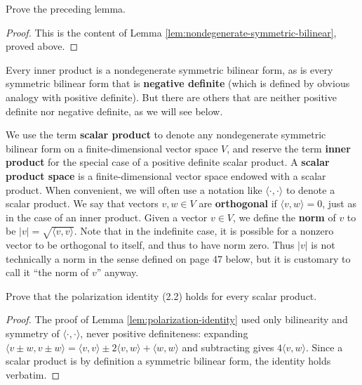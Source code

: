 \begin{exercise}
\label{exer:prove-nondegenerate-equivalent}
\leanok
{}
Prove the preceding lemma.
\end{exercise}

\begin{proof}
\leanok
This is the content of Lemma \ref{lem:nondegenerate-symmetric-bilinear}, proved above.
\end{proof}

Every inner product is a nondegenerate symmetric bilinear form, as is every symmetric bilinear form that is \textbf{negative definite} (which is defined by obvious analogy with positive definite). But there are others that are neither positive definite nor negative definite, as we will see below.

We use the term \textbf{scalar product} to denote any nondegenerate symmetric bilinear form on a finite-dimensional vector space $V$, and reserve the term \textbf{inner product} for the special case of a positive definite scalar product. A \textbf{scalar product space} is a finite-dimensional vector space endowed with a scalar product. When convenient, we will often use a notation like $\langle \cdot, \cdot \rangle$ to denote a scalar product. We say that vectors $v, w \in V$ are \textbf{orthogonal} if $\langle v, w \rangle = 0$, just as in the case of an inner product. Given a vector $v \in V$, we define the \textbf{norm} of $v$ to be $|v| = \sqrt{\langle v, v \rangle}$. Note that in the indefinite case, it is possible for a nonzero vector to be orthogonal to itself, and thus to have norm zero. Thus $|v|$ is not technically a norm in the sense defined on page 47 below, but it is customary to call it ``the norm of $v$'' anyway.

\begin{exercise}
\label{exer:polarization-scalar-product}
\leanok
{}
Prove that the polarization identity (2.2) holds for every scalar product.
\end{exercise}

\begin{proof}
\leanok
The proof of Lemma \ref{lem:polarization-identity} used only bilinearity and symmetry of $\langle \cdot, \cdot \rangle$, never positive definiteness: expanding $\langle v \pm w, v \pm w \rangle = \langle v,v \rangle \pm 2\langle v,w \rangle + \langle w,w \rangle$ and subtracting gives $4\langle v,w \rangle$. Since a scalar product is by definition a symmetric bilinear form, the identity holds verbatim.
\end{proof}


